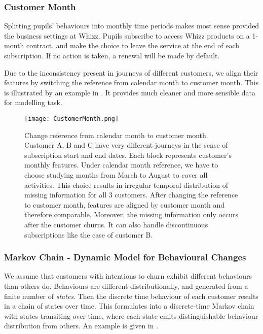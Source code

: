 \subsubsection{Customer Month}

Splitting pupils' behaviours into monthly time periods makes most sense provided the business settings at Whizz. Pupils subscribe to access Whizz products on a 1-month contract, and make the choice to leave the service at the end of each subscription. If no action is taken, a renewal will be made by default.

Due to the inconsistency present in journeys of different customers, we align their features by switching the reference from calendar month to customer month. This is illustrated by an example in . It provides much cleaner and more sensible data for modelling task. 

\begin{figure}[!h]
\centering
\texttt{[image: CustomerMonth.png]}
\caption{Change reference from calendar month to customer month. Customer A, B and C have very different journeys in the sense of subscription start and end dates. Each block represents customer's monthly features. Under calendar month reference, we have to choose studying months from March to August to cover all activities. This choice results in irregular temporal distribution of missing information for all 3 customers. After changing the reference to customer month, features are aligned by customer month and therefore comparable. Moreover, the missing information only occurs after the customer churns. It can also handle discontinuous subscriptions like the case of customer B.}
\label{fig:customerMonth}
\end{figure}

\subsubsection{Markov Chain - Dynamic Model for Behavioural Changes}

We assume that customers with intentions to churn exhibit different behaviours than others do. Behaviours are different distributionally, and generated from a finite number of \textit{states}. Then the discrete time behaviour of each customer results in a chain of states over time. This formulates into a discrete-time Markov chain with states transiting over time, where each state emits distinguishable behaviour distribution from others. An example is given in .

